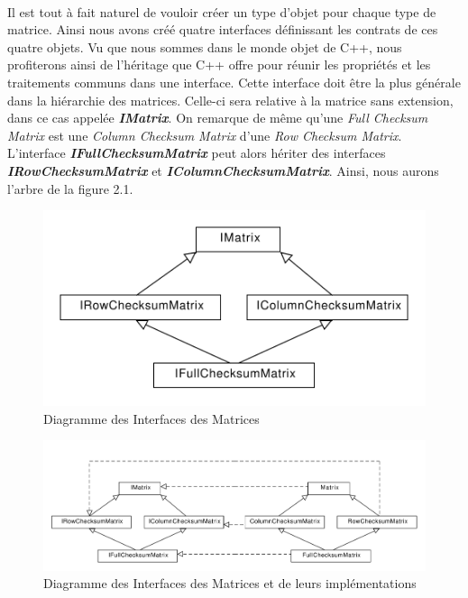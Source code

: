 \documentclass[a4paper,10pt]{report}
\begin{document}
\paragraph*{}
Il est tout à fait naturel de vouloir créer un type d’objet pour chaque type de matrice. Ainsi nous avons créé quatre 
interfaces définissant les contrats de ces quatre objets. Vu que nous sommes dans le monde objet de C++, nous profiterons 
ainsi de l’héritage que C++ offre pour réunir les propriétés et les traitements communs dans une interface. Cette interface 
doit être la plus générale dans la hiérarchie des matrices. Celle-ci sera relative à la matrice sans extension, dans ce cas 
appelée \textbf{\textit{IMatrix}}. On remarque de même qu’une \textit{Full Checksum Matrix} est une \textit{Column Checksum Matrix} 
d’une \textit{Row Checksum Matrix}. L’interface \textbf{\textit{IFullChecksumMatrix}} peut alors hériter des interfaces 
\textbf{\textit{IRowChecksumMatrix}} et \textbf{\textit{IColumnChecksumMatrix}}.
Ainsi, nous aurons l’arbre de la figure 2.1.\newline
\begin{figure}
 \center
 \includegraphics[scale=0.5]{MatricesHierarchie.pdf}
 \caption{Diagramme des Interfaces des Matrices}
\end{figure}

\begin{figure}
 \center
 \includegraphics[scale=0.35]{MatricesHierarchie2.pdf}
 \caption{Diagramme des Interfaces des Matrices et de leurs implémentations}
\end{figure}
\end{document}
